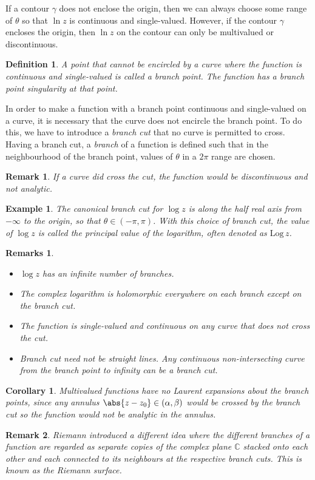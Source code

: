 \documentclass{article}
\theoremstyle{plain}\theoremheaderfont{\normalfont\itshape}\theorembodyfont{\rmfamily}\theoremseparator{.}\newtheorem*{rem}{Remark}\newtheorem*{ex}{Example}\newtheorem*{proof}{Proof}\newtheorem*{altp}{Alternative proof}
\theoremstyle{plain}\theoremheaderfont{\normalfont\bfseries}\theorembodyfont{\rmfamily}\theoremseparator{.}\newtheorem{thm}{Theorem}[section]\newtheorem{lem}[thm]{Lemma}\newtheorem{prop}[thm]{Proposition}\newtheorem*{cor}{Corollary}\newtheorem{defn}[thm]{Definition}\newtheorem{clm}[thm]{Claim}\newtheorem{clminproof}{Claim}
\theoremstyle{break}\theoremheaderfont{\normalfont\itshape}\theorembodyfont{\rmfamily}\theoremseparator{.\medskip}\newtheorem*{proofskip}{Proof}\newtheorem*{exs}{Examples}\newtheorem*{rems}{Remarks}
\theoremstyle{break}\theoremheaderfont{\normalfont\bfseries}\theorembodyfont{\rmfamily}\theoremseparator{.\medskip}\newtheorem{lemskip}[thm]{Lemma}\newtheorem{defnskip}[thm]{Definition}\newtheorem{propskip}[thm]{Proposition}\newtheorem{thmskip}[thm]{Theorem}
\numberwithin{equation}{section}
\begin{document}
	If a contour \(\gamma\) does not enclose the origin, then we can always choose some range of \(\theta\) so that \(\ln z\) is continuous and single-valued. However, if the contour \(\gamma\) encloses the origin, then \(\ln z\) on the contour can only be multivalued or discontinuous.
	\begin{defn}
		A point that cannot be encircled by a curve where the function is continuous and single-valued is called a \textit{branch point}. The function has a \textit{branch point singularity} at that point.
	\end{defn}
	In order to make a function with a branch point continuous and single-valued on a curve, it is necessary that the curve does not encircle the branch point. To do this, we have to introduce a \textit{branch cut} that no curve is permitted to cross. Having a branch cut, a \textit{branch} of a function is defined such that in the neighbourhood of the branch point, values of \(\theta\) in a \(2\pi\) range are chosen.
	\begin{rem}
		If a curve did cross the cut, the function would be discontinuous and not analytic.
	\end{rem}
	\begin{ex}
		The canonical branch cut for \(\log z\) is along the half real axis from \(-\infty\) to the origin, so that \(\theta\in(-\pi,\pi)\). With this choice of branch cut, the value of \(\log z\) is called the \textit{principal value} of the logarithm, often denoted as \(\mathrm{Log}\,z\).
	\end{ex}
	\begin{rems}
		\begin{itemize}[topsep=0pt]
			\item \(\log z\) has an infinite number of branches.
			\item The complex logarithm is holomorphic everywhere on each branch except on the branch cut.
			\item The function is single-valued and continuous on any curve that does not cross the cut.
			\item Branch cut need not be straight lines. Any continuous non-intersecting curve from the branch point to infinity can be a branch cut.
		\end{itemize}
	\end{rems}
	
	\begin{cor}
		Multivalued functions have no Laurent expansions about the branch points, since any annulus \(\abs{z-z_0}\in(\alpha,\beta)\) would be crossed by the branch cut so the function would not be analytic in the annulus.
	\end{cor}
	\begin{rem}
		Riemann introduced a different idea where the different branches of a function are regarded as separate copies of the complex plane \(\mathbb{C}\) stacked onto each other and each connected to its neighbours at the respective branch cuts. This is known as the \textit{Riemann surface}.
	\end{rem}
\end{document}
